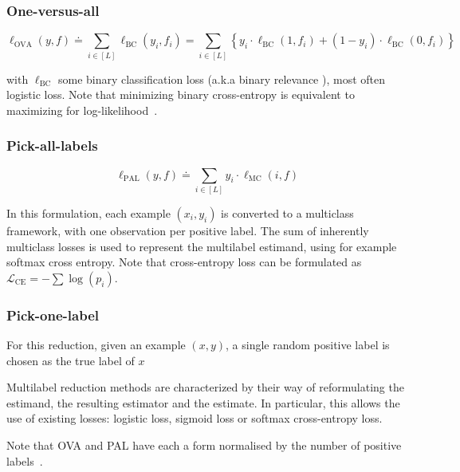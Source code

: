 \subsubsection*{One-versus-all}

\begin{equation}
\ell_{\mathrm{OVA}}(y, f) \doteq \sum_{i \in[L]} \ell_{\mathrm{BC}}\left(y_{i}, f_{i}\right)=\sum_{i \in[L]}\left\{y_{i} \cdot \ell_{\mathrm{BC}}\left(1, f_{i}\right)+\left(1-y_{i}\right) \cdot \ell_{\mathrm{BC}}\left(0, f_{i}\right)\right\}
\end{equation}

with $\ell_{\mathrm{BC}}$ some binary classification loss (a.k.a binary relevance \cite{OVA1, hammingLoss, OVA2}), most often logistic loss.  Note that minimizing binary cross-entropy is equivalent to maximizing for log-likelihood~\cite[Section 4.3.4]{Bishop}.

\subsubsection*{Pick-all-labels}

\begin{equation}
\ell_{\mathrm{PAL}}(y, f) \doteq \sum_{i \in[L]} y_{i} \cdot \ell_{\mathrm{MC}}(i, f)
\end{equation}

In this formulation, each example $(x_i, y_i)$ is converted to a multiclass framework, with one observation per positive label. The sum of inherently multiclass losses is used to represent the multilabel estimand, using for example softmax cross entropy. Note that cross-entropy loss can be formulated as \(\mathcal{L}_{\text {CE}}=-\sum \log \left(p_{i}\right)\).

\subsubsection*{Pick-one-label}

For this reduction, given an example $(x,y)$, a single random positive label is chosen as the true label of $x$

\vspace{\baselineskip}

Multilabel reduction methods are characterized by their way of reformulating the estimand, the resulting estimator and the estimate. In particular, this allows the use of existing losses: logistic loss, sigmoid loss or softmax cross-entropy loss.

Note that OVA and PAL have each a form normalised by the number of positive labels~\cite{multilabelReduction}.

